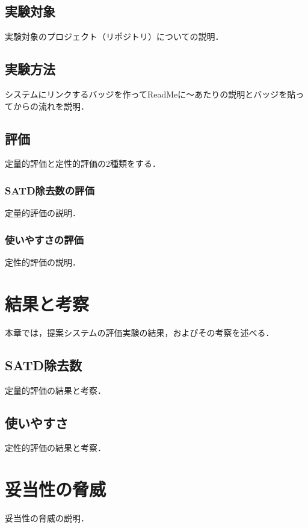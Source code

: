 \documentclass[12pt]{jarticle} %
\begin{document}
\subsection{実験対象}
実験対象のプロジェクト（リポジトリ）についての説明．

\subsection{実験方法}
システムにリンクするバッジを作ってReadMeに～あたりの説明とバッジを貼ってからの流れを説明．

\subsection{評価}
定量的評価と定性的評価の2種類をする．

\subsubsection{SATD除去数の評価}
定量的評価の説明．

\subsubsection{使いやすさの評価}
定性的評価の説明．


\newpage
\section{結果と考察}
本章では，提案システムの評価実験の結果，およびその考察を述べる．

\subsection{SATD除去数}
定量的評価の結果と考察．

\subsection{使いやすさ}
定性的評価の結果と考察．


\newpage
\section{妥当性の脅威}
妥当性の脅威の説明．\cite{caffe}


\newpage
\end{document}
